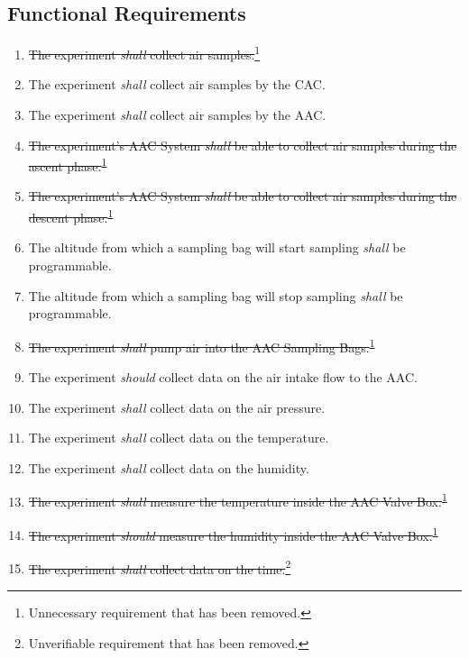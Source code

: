 \subsection{Functional Requirements}

\begin{enumerate}[label=F.\arabic*]
    \item \st{The experiment \textit{shall} collect air samples.}\footnote{Unnecessary requirement that has been removed.\label{fn:unnecessary-requirement}}
    \item The experiment \textit{shall} collect air samples by the CAC.
    \item The experiment \textit{shall} collect air samples by the AAC.
    \item \st{The experiment's AAC System \textit{shall} be able to collect air samples during the ascent phase.}\textsuperscript{\ref{fn:unnecessary-requirement}}
    \item \st{The experiment's AAC System \textit{shall} be able to collect air samples during the descent phase.}\textsuperscript{\ref{fn:unnecessary-requirement}}
    \item The altitude from which a sampling bag will start sampling \textit{shall} be programmable.
    \item The altitude from which a sampling bag will stop sampling \textit{shall} be programmable.
    \item \st{The experiment \textit{shall} pump air into the AAC Sampling Bags.}\textsuperscript{\ref{fn:unnecessary-requirement}}
    \item The experiment \textit{should} collect data on the air intake flow to the AAC.
    \item The experiment \textit{shall} collect data on the air pressure.
    \item The experiment \textit{shall} collect data on the temperature.
    \item The experiment \textit{shall} collect data on the humidity.
    \item \st{The experiment \textit{shall} measure the temperature inside the AAC Valve Box.}\textsuperscript{\ref{fn:unnecessary-requirement}}
    \item \st{The experiment \textit{should} measure the humidity inside the AAC Valve Box.}\textsuperscript{\ref{fn:unnecessary-requirement}}
    \item \st{The experiment \textit{shall} collect data on the time.}\footnote{Unverifiable requirement that has been removed.\label{fn:unverifiable-requirement}}

\end{enumerate}

